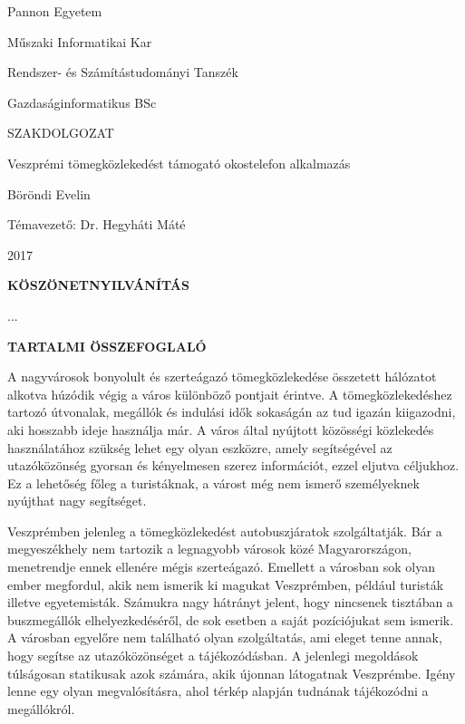 \documentclass[a4paper,oneside,10pt]{report}
\begin{document}
\begin{titlepage}
\begin{center}
\Large
Pannon Egyetem

\vspace{10mm}
Műszaki Informatikai Kar

\vspace{10mm}
Rendszer- és Számítástudományi Tanszék

\vspace{10mm}
Gazdaságinformatikus BSc

\vspace{40mm}
\huge
SZAKDOLGOZAT

\vspace{10mm}
\LARGE
Veszprémi tömegközlekedést támogató okostelefon alkalmazás 

\vspace{10mm}
\Large
Böröndi Evelin

\vspace{40mm}
Témavezető: Dr. Hegyháti Máté

\vspace{10mm}
2017
\normalsize
\end{center}
\end{titlepage}



\pagestyle{empty} %



\newpage
\Large
\begin{center}
	\textbf{KÖSZÖNETNYILVÁNÍTÁS}
\end{center}
\normalsize
\noindent
...

\newpage
\Large
\begin{center}
	\textbf{TARTALMI ÖSSZEFOGLALÓ}
\end{center}
\normalsize
\noindent

A nagyvárosok bonyolult és szerteágazó tömegközlekedése összetett hálózatot alkotva húzódik végig a város különböző pontjait érintve.
A tömegközlekedéshez tartozó útvonalak, megállók és indulási idők sokaságán az tud igazán kiigazodni, aki hosszabb ideje használja már. 
A város által nyújtott közösségi közlekedés használatához szükség lehet egy olyan eszközre, amely segítségével az utazóközönség gyorsan és kényelmesen szerez információt, ezzel eljutva céljukhoz.
Ez a lehetőség főleg a turistáknak, a várost még nem ismerő személyeknek nyújthat nagy segítséget.

Veszprémben jelenleg a tömegközlekedést autobuszjáratok szolgáltatják.
Bár a megyeszékhely nem tartozik a legnagyobb városok közé Magyarországon, menetrendje ennek ellenére mégis szerteágazó.
Emellett a városban sok olyan ember megfordul, akik nem ismerik ki magukat Veszprémben, például turisták illetve egyetemisták.
Számukra nagy hátrányt jelent, hogy nincsenek tisztában a buszmegállók elhelyezkedéséről, de sok esetben a saját pozíciójukat sem ismerik.
A városban egyelőre nem található olyan szolgáltatás, ami eleget tenne annak, hogy segítse az utazóközönséget a tájékozódásban.
A jelenlegi megoldások túlságosan statikusak azok számára, akik újonnan látogatnak Veszprémbe.
Igény lenne egy olyan megvalósításra, ahol térkép alapján tudnának tájékozódni a megállókról.
\end{document}
